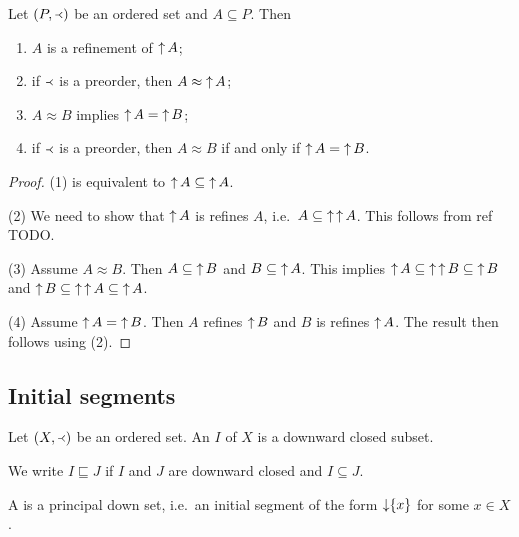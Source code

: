 \begin{lemma}
Let $\sSet{P,\Yleft}$ be an ordered set and $A \subseteq P$. Then
\begin{enumerate}
\item $A$ is a refinement of $\operatorname{\uparrow} A$;
\item if $\Yleft$ is a preorder, then $A \approx \operatorname{\uparrow} A$;
\item $A \approx B$ implies $\operatorname{\uparrow} A = \operatorname{\uparrow} B$;
\item if $\Yleft$ is a preorder, then $A \approx B$ \textup{if and only if} $\operatorname{\uparrow} A = \operatorname{\uparrow} B$.
\end{enumerate}
\end{lemma}
\begin{proof}
(1) is equivalent to $\operatorname{\uparrow} A \subseteq \operatorname{\uparrow} A$.

(2) We need to show that $\operatorname{\uparrow} A$ is refines $A$, i.e.\ $A\subseteq \operatorname{\uparrow}\operatorname{\uparrow} A$. This follows from ref TODO.

(3) Assume $A \approx B$. Then $A \subseteq \operatorname{\uparrow} B$ and $B \subseteq \operatorname{\uparrow} A$. This implies $\operatorname{\uparrow} A \subseteq \operatorname{\uparrow}\operatorname{\uparrow} B \subseteq \operatorname{\uparrow} B$ and $\operatorname{\uparrow} B \subseteq \operatorname{\uparrow}\operatorname{\uparrow} A \subseteq \operatorname{\uparrow} A$.

(4) Assume $\operatorname{\uparrow} A = \operatorname{\uparrow} B$. Then $A$ refines $\operatorname{\uparrow} B$ and $B$ is refines $\operatorname{\uparrow} A$. The result then follows using (2).
\end{proof}

\subsection{Initial segments}
\begin{definition}
Let $(X,\Yleft)$ be an ordered set. An  $I$ of $X$ is a downward closed subset.

We write $I \sqsubseteq J$ if $I$ and $J$ are downward closed and $I\subseteq J$.

A  is a principal down set, i.e.\ an initial segment of the form $\operatorname{\downarrow}\{x\}$ for some $x\in X$.
\end{definition}

